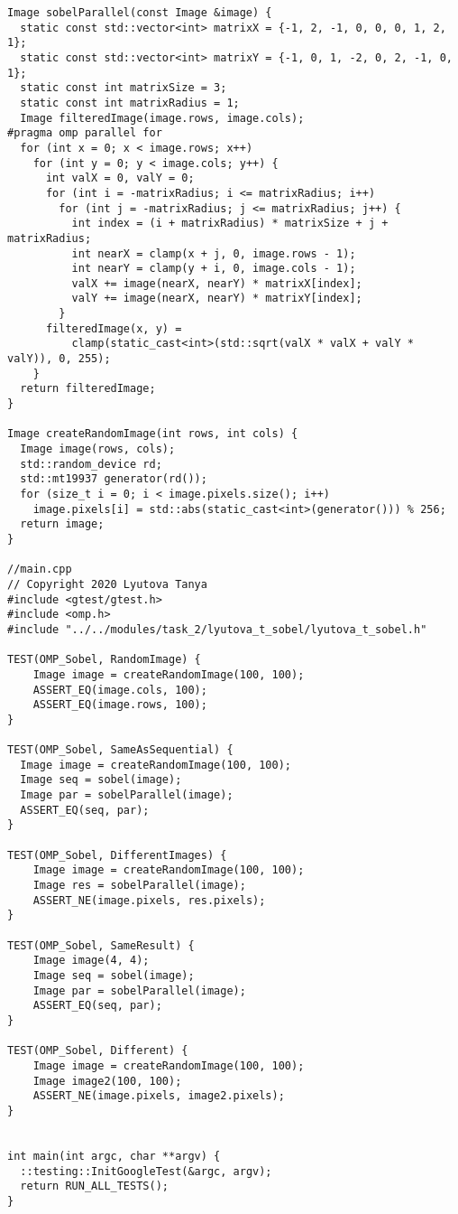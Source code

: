 \documentclass{report}
\begin{document}
\begin{lstlisting}
Image sobelParallel(const Image &image) {
  static const std::vector<int> matrixX = {-1, 2, -1, 0, 0, 0, 1, 2, 1};
  static const std::vector<int> matrixY = {-1, 0, 1, -2, 0, 2, -1, 0, 1};
  static const int matrixSize = 3;
  static const int matrixRadius = 1;
  Image filteredImage(image.rows, image.cols);
#pragma omp parallel for
  for (int x = 0; x < image.rows; x++)
    for (int y = 0; y < image.cols; y++) {
      int valX = 0, valY = 0;
      for (int i = -matrixRadius; i <= matrixRadius; i++)
        for (int j = -matrixRadius; j <= matrixRadius; j++) {
          int index = (i + matrixRadius) * matrixSize + j + matrixRadius;
          int nearX = clamp(x + j, 0, image.rows - 1);
          int nearY = clamp(y + i, 0, image.cols - 1);
          valX += image(nearX, nearY) * matrixX[index];
          valY += image(nearX, nearY) * matrixY[index];
        }
      filteredImage(x, y) =
          clamp(static_cast<int>(std::sqrt(valX * valX + valY * valY)), 0, 255);
    }
  return filteredImage;
}

Image createRandomImage(int rows, int cols) {
  Image image(rows, cols);
  std::random_device rd;
  std::mt19937 generator(rd());
  for (size_t i = 0; i < image.pixels.size(); i++)
    image.pixels[i] = std::abs(static_cast<int>(generator())) % 256;
  return image;
}

//main.cpp
// Copyright 2020 Lyutova Tanya
#include <gtest/gtest.h>
#include <omp.h>
#include "../../modules/task_2/lyutova_t_sobel/lyutova_t_sobel.h"

TEST(OMP_Sobel, RandomImage) {
    Image image = createRandomImage(100, 100);
    ASSERT_EQ(image.cols, 100);
    ASSERT_EQ(image.rows, 100);
}

TEST(OMP_Sobel, SameAsSequential) {
  Image image = createRandomImage(100, 100);
  Image seq = sobel(image);
  Image par = sobelParallel(image);
  ASSERT_EQ(seq, par);
}

TEST(OMP_Sobel, DifferentImages) {
    Image image = createRandomImage(100, 100);
    Image res = sobelParallel(image);
    ASSERT_NE(image.pixels, res.pixels);
}

TEST(OMP_Sobel, SameResult) {
    Image image(4, 4);
    Image seq = sobel(image);
    Image par = sobelParallel(image);
    ASSERT_EQ(seq, par);
}

TEST(OMP_Sobel, Different) {
    Image image = createRandomImage(100, 100);
    Image image2(100, 100);
    ASSERT_NE(image.pixels, image2.pixels);
}


int main(int argc, char **argv) {
  ::testing::InitGoogleTest(&argc, argv);
  return RUN_ALL_TESTS();
}
\end{lstlisting}
\end{document}
